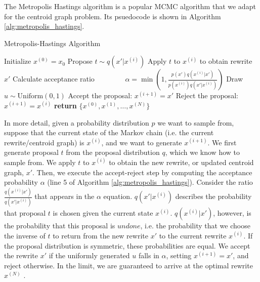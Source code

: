 \documentclass{article}
\begin{document}
The Metropolis Hastings algorithm is a popular MCMC algorithm that we adapt for the centroid graph problem. Its psuedocode is shown in Algorithm \ref{alg:metropolis_hastings}.

\begin{algorithm}
\caption{Metropolis-Hastings Algorithm}\label{alg:metropolis_hastings}
\begin{algorithmic}[1] %
    \State Initialize $x^{(0)} = x_0$
        \State Propose $t \sim q(x'|x^{(i)})$
        \State Apply $t$ to $x^{(i)}$ to obtain rewrite $x'$
        \State Calculate acceptance ratio \Statex $\qquad\qquad\alpha = \min\left(1, \frac{p(x')q(x^{(i)}|x')}{p(x^{(i)})q(x'|x^{(i)})}\right)$
        \State Draw $u \sim \text{Uniform}(0, 1)$
            \State Accept the proposal: $x^{(i+1)} = x'$
        \Else
            \State Reject the proposal: $x^{(i+1)} = x^{(i)}$
        \EndIf
    \EndFor
    \State \textbf{return} $\{x^{(0)}, x^{(1)}, \ldots, x^{(N)}\}$
\EndProcedure
\end{algorithmic}
\label{alg:metropolis_hastings}
\end{algorithm}

In more detail, given a probability distribution $p$ we want to sample from, suppose that the current state of the Markov chain (i.e. the current rewrite/centroid graph) is $x^{(i)}$, and we want to generate $x^{(i+1)}$. We first generate proposal $t$ from the proposal distribution $q$, which we know how to sample from. We apply $t$ to $x^{(i)}$ to obtain the new rewrite, or updated centroid graph, $x'$. Then, we execute the accept-reject step by computing the acceptance probability $\alpha$ (line 5 of Algorithm \ref{alg:metropolis_hastings}). Consider the ratio $\frac{q(x^{(i)}|x')}{q(x'|x^{(i)})}$ that appears in the $\alpha$ equation. $q(x'|x^{(i)})$ describes the probability that proposal $t$ is chosen given the current state $x^{(i)}$. $q(x^{(i)}|x')$, however, is the probability that this proposal is $undone$, i.e. the probability that we choose the inverse of $t$ to return from the new rewrite $x'$ to the current rewrite $x^{(i)}$. If the proposal distribution is symmetric, these probabilities are equal. We accept the rewrite $x'$ if the uniformly generated $u$ falls in $\alpha$, setting $x^{(i+1)} = x'$, and reject otherwise. In the limit, we are guaranteed to arrive at the optimal rewrite $x^{(N)}$ \cite{metropolis_hastings}.
\end{document}
